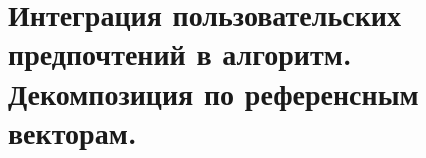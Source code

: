 \section{Интеграция пользовательских предпочтений в алгоритм. Декомпозиция по референсным векторам.}
